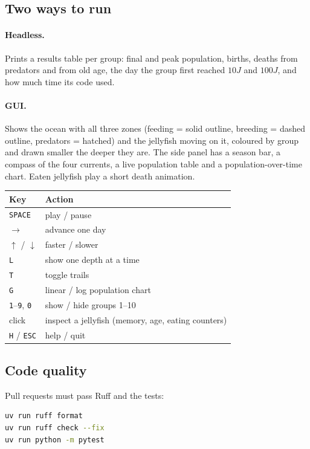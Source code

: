 \documentclass[11pt]{article}
\begin{document}
\subsection{Two ways to run}
\paragraph{Headless.} Prints a results table per group: final and peak
population, births, deaths from predators and from old age, the day the
group first reached $10J$ and $100J$, and how much time its code used.

\paragraph{GUI.} Shows the ocean with all three zones (feeding = solid
outline, breeding = dashed outline, predators = hatched) and the
jellyfish moving on it, coloured by group and drawn smaller the deeper
they are. The side panel has a season bar, a compass of the four
currents, a live population table and a population-over-time chart.
Eaten jellyfish play a short death animation.

\begin{center}
\begin{tabular}{@{}ll@{}}
\toprule
\textbf{Key} & \textbf{Action} \\
\midrule
\texttt{SPACE} & play / pause \\
$\rightarrow$ & advance one day \\
$\uparrow$ / $\downarrow$ & faster / slower \\
\texttt{L} & show one depth at a time \\
\texttt{T} & toggle trails \\
\texttt{G} & linear / log population chart \\
\texttt{1}--\texttt{9}, \texttt{0} & show / hide groups 1--10 \\
click & inspect a jellyfish (memory, age, eating counters) \\
\texttt{H} / \texttt{ESC} & help / quit \\
\bottomrule
\end{tabular}
\end{center}

\subsection{Code quality}
Pull requests must pass Ruff and the tests:
\begin{lstlisting}[language=bash]
uv run ruff format
uv run ruff check --fix
uv run python -m pytest
\end{lstlisting}
\end{document}
